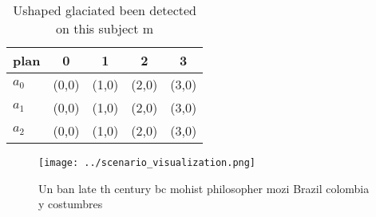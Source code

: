 \documentclass[a4paper]{article}
\begin{document}
\begin{table}
\begin{adjustbox}{width=0.6\columnwidth}
\begin{tabular}{|l|l|l|l|l|}
\hline
\textbf{plan} & \multicolumn{1}{c|}{\textbf{0}} & \multicolumn{1}{c|}{\textbf{1}} & \multicolumn{1}{c|}{\textbf{2}} & \multicolumn{1}{c|}{\textbf{3}} \\ \hline
\textbf{$a_0$}  & (0,0) & (1,0) & (2,0) & (3,0) \\ \hline
\textbf{$a_1$}  & (0,0) & (1,0) & (2,0) & (3,0) \\ \hline
\textbf{$a_2$}  & (0,0) & (1,0) & (2,0) & (3,0) \\ \hline
\end{tabular}
\end{adjustbox}
\caption{Ushaped glaciated been detected on this subject m
}
\end{table}

\begin{figure}
\centering
\texttt{[image: ../scenario\_visualization.png]}
\caption{Un ban late th century bc mohist philosopher mozi Brazil colombia y costumbres 
}
\end{figure}
 
\end{document}
